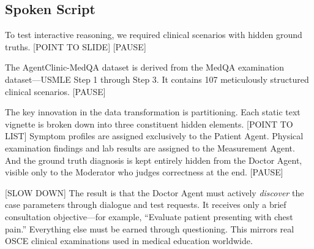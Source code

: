 \documentclass[12pt]{article}
\begin{document}
  \subsection*{Spoken Script}
  \begin{spokenbox}
  To test interactive reasoning, we required clinical scenarios with hidden ground truths. [POINT TO SLIDE] [PAUSE]

  The AgentClinic-MedQA dataset is derived from the MedQA examination dataset---USMLE Step 1 through Step 3. It contains 107 meticulously structured clinical scenarios. [PAUSE]

  The key innovation in the data transformation is partitioning. Each static text vignette is broken down into three constituent hidden elements. [POINT TO LIST] Symptom profiles are assigned exclusively to the Patient Agent. Physical examination findings and lab results are assigned to the Measurement Agent. And the ground truth diagnosis is kept entirely hidden from the Doctor Agent, visible only to the Moderator who judges correctness at the end. [PAUSE]

  [SLOW DOWN] The result is that the Doctor Agent must actively \textit{discover} the case parameters through dialogue and test requests. It receives only a brief consultation objective---for example, ``Evaluate patient presenting with chest pain.'' Everything else must be earned through questioning. This mirrors real OSCE clinical examinations used in medical education worldwide.
  \end{spokenbox}
\end{document}
